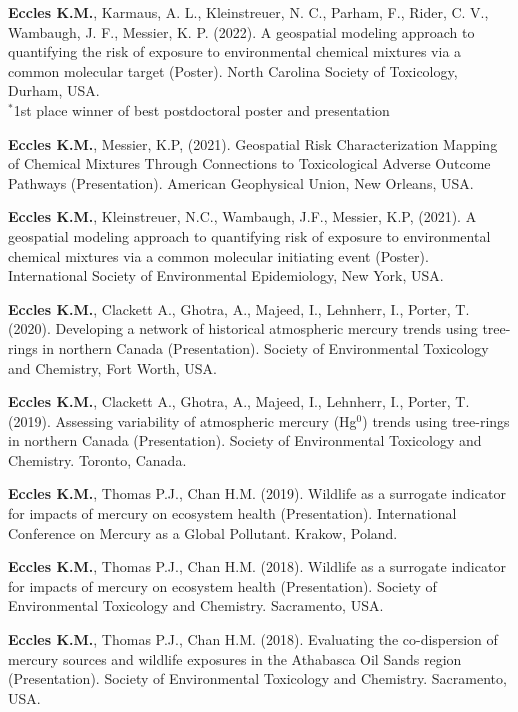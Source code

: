 \documentclass[margin,line]{res}
\begin{document}
\begin{resume}
\begin{etaremune}[start=12]
\item \textbf{Eccles K.M.}, Karmaus, A. L., Kleinstreuer, N. C., Parham, F., Rider, C. V., Wambaugh, J. F., Messier, K. P. (2022). A geospatial modeling approach to quantifying the risk of exposure to environmental chemical mixtures via a common molecular target (Poster). North Carolina Society of Toxicology, Durham, USA.\\
$^{*}$1st place winner of best postdoctoral poster and presentation

\item \textbf{Eccles K.M.}, Messier, K.P, (2021). Geospatial Risk Characterization Mapping of Chemical Mixtures Through Connections to Toxicological Adverse Outcome Pathways (Presentation). American Geophysical Union, New Orleans, USA.

\item \textbf{Eccles K.M.}, Kleinstreuer, N.C., Wambaugh, J.F., Messier, K.P, (2021). A geospatial modeling approach to quantifying risk of exposure to environmental chemical mixtures via a common molecular initiating event (Poster). International Society of Environmental Epidemiology, New York, USA.

\item \textbf{Eccles K.M.}, Clackett A., Ghotra, A., Majeed, I., Lehnherr, I., Porter, T. (2020). Developing a network of historical atmospheric mercury trends using tree-rings in northern Canada (Presentation).  Society of Environmental Toxicology and Chemistry, Fort Worth, USA.

\item \textbf{Eccles K.M.}, Clackett A., Ghotra, A., Majeed, I., Lehnherr, I., Porter, T. (2019). Assessing variability of atmospheric mercury (Hg$^{0}$) trends using tree-rings in northern Canada (Presentation). Society of Environmental Toxicology and Chemistry. Toronto, Canada.

\item \textbf{Eccles K.M.}, Thomas P.J., Chan H.M. (2019). Wildlife as a surrogate indicator for impacts of mercury on ecosystem health (Presentation). International Conference on Mercury as a Global Pollutant. Krakow, Poland.

\item \textbf{Eccles K.M.}, Thomas P.J., Chan H.M. (2018). Wildlife as a surrogate indicator for impacts of mercury on ecosystem health (Presentation). Society of Environmental Toxicology and Chemistry. Sacramento, USA.

\item \textbf{Eccles K.M.}, Thomas P.J., Chan H.M. (2018). Evaluating the co-dispersion of mercury sources and wildlife exposures in the Athabasca Oil Sands region (Presentation). Society of Environmental Toxicology and Chemistry. Sacramento, USA.


\end{etaremune}
\end{resume}
\end{document}
